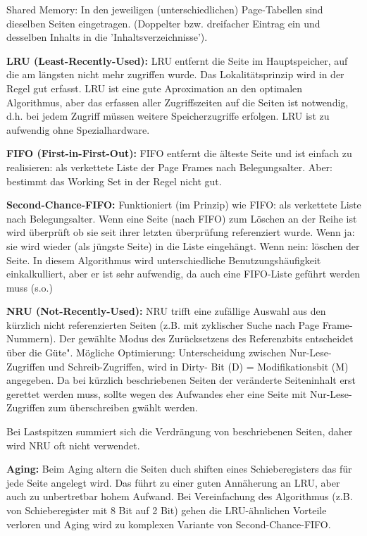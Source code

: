 \begin{answer}
  Shared Memory:
  In den jeweiligen (unterschiedlichen) Page-Tabellen sind dieselben Seiten eingetragen. (Doppelter bzw. dreifacher Eintrag ein und desselben Inhalts in die 'Inhaltsverzeichnisse').
\end{answer}

\begin{answer}
  \textbf{LRU (Least-Recently-Used):}
  LRU entfernt die Seite im Hauptspeicher, auf die am längsten nicht mehr zugriffen
  wurde. Das Lokalitätsprinzip wird in der Regel gut erfasst. LRU ist eine gute
  Aproximation an den optimalen Algorithmus,
  aber das erfassen aller Zugriffszeiten auf die Seiten ist notwendig, d.h. bei jedem
  Zugriff müssen weitere Speicherzugriffe erfolgen. LRU ist zu aufwendig ohne Spezialhardware.

  \textbf{FIFO (First-in-First-Out):}
  FIFO entfernt die älteste Seite und ist einfach zu realisieren: als verkettete Liste der
  Page Frames nach Belegungsalter.
  Aber: bestimmt das Working Set in der Regel nicht gut.

  \textbf{Second-Chance-FIFO:}
  Funktioniert (im Prinzip) wie FIFO: als verkettete Liste nach Belegungsalter. Wenn
  eine Seite (nach FIFO) zum Löschen an der Reihe ist wird überprüft ob sie seit
  ihrer letzten überprüfung referenziert wurde. Wenn ja: sie wird wieder (als jüngste
  Seite) in die Liste eingehängt. Wenn nein: löschen der Seite.
  In diesem Algorithmus wird unterschiedliche Benutzungshäufigkeit einkalkulliert,
  aber er ist sehr aufwendig, da auch eine FIFO-Liste geführt werden muss (s.o.)

  \textbf{NRU (Not-Recently-Used):}
  NRU trifft eine zufällige Auswahl aus den kürzlich nicht referenzierten Seiten (z.B.
  mit zyklischer Suche nach Page Frame-Nummern). Der gewählte Modus des Zurücksetzens
  des Referenzbits entscheidet über die Güte".
  Mögliche Optimierung:
  Unterscheidung zwischen Nur-Lese-Zugriffen und Schreib-Zugriffen, wird in Dirty-
  Bit (D) = Modifikationsbit (M) angegeben.
  Da bei kürzlich beschriebenen Seiten der veränderte Seiteninhalt erst gerettet werden
  muss, sollte wegen des Aufwandes eher eine Seite mit Nur-Lese-Zugriffen zum
  überschreiben gwählt werden.

  Bei Lastspitzen summiert sich die Verdrängung von beschriebenen Seiten, daher
  wird NRU oft nicht verwendet.
  
  \textbf{Aging:}
  Beim Aging altern die Seiten duch shiften eines Schieberegisters das für jede Seite
  angelegt wird. Das führt zu einer guten Annäherung an LRU, aber auch zu unbertretbar
  hohem Aufwand. Bei Vereinfachung des Algorithmus (z.B. von Schieberegister
  mit 8 Bit auf 2 Bit) gehen die LRU-ähnlichen Vorteile verloren und Aging wird
  zu komplexen Variante von Second-Chance-FIFO.
\end{answer}

